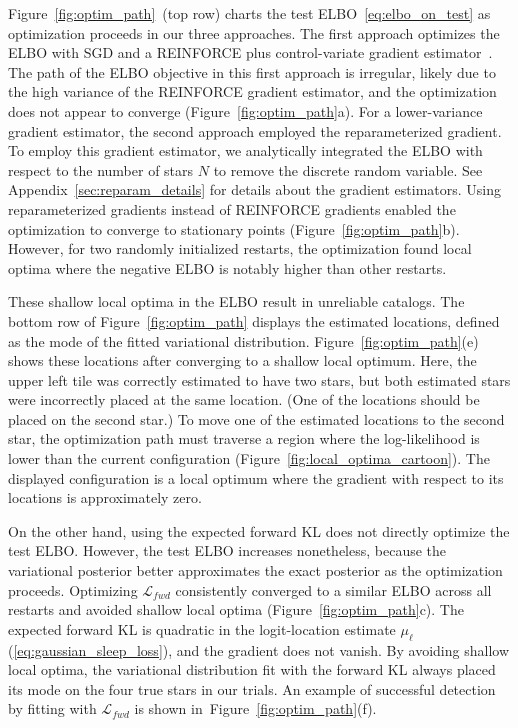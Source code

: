 Figure~\ref{fig:optim_path}~(top row) charts the test ELBO~\eqref{eq:elbo_on_test}
as optimization proceeds in our three approaches.
The first approach optimizes the ELBO with SGD and a REINFORCE plus control-variate gradient estimator~\citep{ranganath2013black}.
The path of the ELBO objective in this first approach is irregular, likely due to the high variance of the REINFORCE gradient estimator, 
and the optimization does not appear to converge (Figure~\ref{fig:optim_path}a).
For a lower-variance gradient estimator, the second approach employed the reparameterized gradient. To employ this gradient estimator, we analytically integrated the ELBO with respect to the number of stars $N$ to remove the discrete random variable.
See Appendix~\ref{sec:reparam_details} for details about the gradient estimators.
Using reparameterized gradients instead of REINFORCE gradients enabled the optimization to converge to stationary points (Figure~\ref{fig:optim_path}b).
However, for two randomly initialized restarts,
the optimization found local optima where the negative ELBO is notably higher than other restarts.

These shallow local optima in the ELBO result in unreliable catalogs.
The bottom row of Figure~\ref{fig:optim_path} displays the estimated locations, defined as the mode of the fitted variational distribution.
Figure~\ref{fig:optim_path}(e) shows these locations after converging to a shallow local optimum.
Here, the upper left tile was correctly estimated to have two stars, but both estimated stars were incorrectly placed at the same location.
(One of the locations should be placed on the second star.)
To move one of the estimated locations to the second star, the optimization path must traverse a region where the log-likelihood is lower than the current configuration (Figure~\ref{fig:local_optima_cartoon}).
The displayed configuration is a local optimum where the gradient with respect to its locations is approximately zero.

On the other hand, using
the expected forward KL does not directly optimize the test ELBO.
However, the test ELBO increases nonetheless, because the variational posterior
better approximates the exact posterior as the optimization proceeds.
Optimizing $\mathcal{L}_{fwd}$ consistently converged to
a similar ELBO across all restarts and avoided shallow local optima (Figure~\ref{fig:optim_path}c).
The expected forward KL is quadratic in the logit-location estimate
$\mu_\ell$ (\ref{eq:gaussian_sleep_loss}),
and the gradient does not vanish.
By avoiding shallow local optima, the variational distribution fit with the forward KL
always placed its mode on the four true stars in our trials.
An example of successful detection by fitting with
$\mathcal{L}_{fwd}$ is shown in~Figure~\ref{fig:optim_path}(f).

